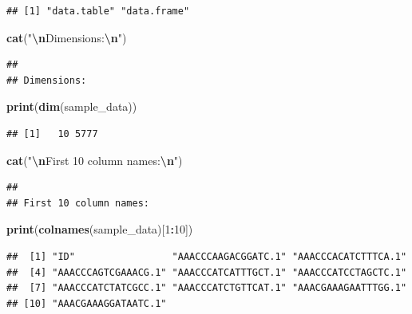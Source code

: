 \documentclass[
]{article}
\newenvironment{Shaded}{\begin{snugshade}}{\end{snugshade}}
\newcommand{\DecValTok}[1]{\textcolor[rgb]{0.00,0.00,0.81}{#1}}
\newcommand{\FunctionTok}[1]{\textcolor[rgb]{0.13,0.29,0.53}{\textbf{#1}}}
\newcommand{\NormalTok}[1]{#1}
\newcommand{\SpecialCharTok}[1]{\textcolor[rgb]{0.81,0.36,0.00}{\textbf{#1}}}
\newcommand{\StringTok}[1]{\textcolor[rgb]{0.31,0.60,0.02}{#1}}
\begin{document}
\begin{verbatim}
## [1] "data.table" "data.frame"
\end{verbatim}

\begin{Shaded}
\begin{Highlighting}[]
\FunctionTok{cat}\NormalTok{(}\StringTok{"}\SpecialCharTok{\textbackslash{}n}\StringTok{Dimensions:}\SpecialCharTok{\textbackslash{}n}\StringTok{"}\NormalTok{)}
\end{Highlighting}
\end{Shaded}

\begin{verbatim}
## 
## Dimensions:
\end{verbatim}

\begin{Shaded}
\begin{Highlighting}[]
\FunctionTok{print}\NormalTok{(}\FunctionTok{dim}\NormalTok{(sample\_data))}
\end{Highlighting}
\end{Shaded}

\begin{verbatim}
## [1]   10 5777
\end{verbatim}

\begin{Shaded}
\begin{Highlighting}[]
\FunctionTok{cat}\NormalTok{(}\StringTok{"}\SpecialCharTok{\textbackslash{}n}\StringTok{First 10 column names:}\SpecialCharTok{\textbackslash{}n}\StringTok{"}\NormalTok{)}
\end{Highlighting}
\end{Shaded}

\begin{verbatim}
## 
## First 10 column names:
\end{verbatim}

\begin{Shaded}
\begin{Highlighting}[]
\FunctionTok{print}\NormalTok{(}\FunctionTok{colnames}\NormalTok{(sample\_data)[}\DecValTok{1}\SpecialCharTok{:}\DecValTok{10}\NormalTok{])}
\end{Highlighting}
\end{Shaded}

\begin{verbatim}
##  [1] "ID"                 "AAACCCAAGACGGATC.1" "AAACCCACATCTTTCA.1"
##  [4] "AAACCCAGTCGAAACG.1" "AAACCCATCATTTGCT.1" "AAACCCATCCTAGCTC.1"
##  [7] "AAACCCATCTATCGCC.1" "AAACCCATCTGTTCAT.1" "AAACGAAAGAATTTGG.1"
## [10] "AAACGAAAGGATAATC.1"
\end{verbatim}
\end{document}
